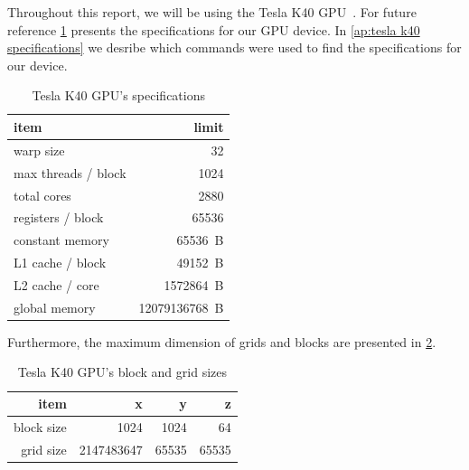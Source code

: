 Throughout this report, we will be using the Tesla K40 GPU~\cite{teslak402013nvidia}.
For future reference \cref{tab:tesla k40 specs} presents the specifications for our GPU device.
In \cref{ap:tesla k40 specifications} we desribe which commands were used to find the specifications for our device.

\begin{table}[htb]
  \centering
  \begin{tabular}{l r}
    \toprule
    item                        & limit \\
    \midrule
    warp size                   & \SI{32}{} \\
    max threads / block         & \SI{1024}{} \\
    total cores                 & \SI{2880}{} \\
    registers / block           & \SI{65536}{} \\
    constant memory             & \SI{65536}{B} \\
    L1 cache / block            & \SI{49152}{B}  \\
    L2 cache / core             & \SI{1572864}{B}  \\
    global memory               & \SI{12079136768}{B} \\
    \bottomrule
  \end{tabular}
  \caption{Tesla K40 GPU's specifications}
  \label{tab:tesla k40 specs}
\end{table}

Furthermore, the maximum dimension of grids and blocks are presented in \cref{tab:tesla k40 grid and block}.

\begin{table}[htb]
  \centering
  \begin{tabular}{r r r r}
    \toprule
    item & x & y & z \\
    \midrule
    block size & \SI{1024}{} & \SI{1024}{} & \SI{64}{} \\
    grid size  & \SI{2147483647}{} & \SI{65535}{} & \SI{65535}{} \\
    \bottomrule
  \end{tabular}
  \caption{Tesla K40 GPU's block and grid sizes}
  \label{tab:tesla k40 grid and block}
\end{table}
